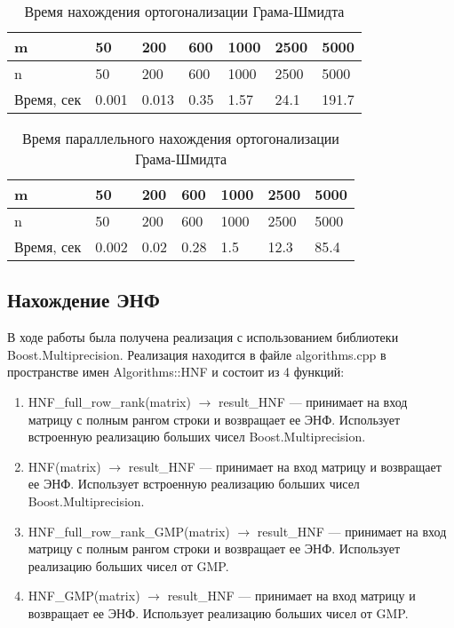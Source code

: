 \begin{table}[H]
  \caption{Время нахождения ортогонализации Грама-Шмидта}
  \centering
  \begin{tabular}{ | l | l | l | l | l | l | l | }
  \hline
  m & 50 & 200 & 600 & 1000 & 2500 & 5000 \\ \hline
  n & 50 & 200 & 600 & 1000 & 2500 & 5000  \\ \hline
  Время, сек & 0.001 & 0.013 & 0.35 & 1.57 & 24.1 & 191.7 \\ \hline
  \end{tabular}
  \label{table:GS_SEQ}
\end{table}

\begin{table}[H]
  \caption{Время параллельного нахождения ортогонализации Грама-Шмидта}
  \centering
  \begin{tabular}{ | l | l | l | l | l | l | l | }
  \hline
  m & 50 & 200 & 600 & 1000 & 2500 & 5000 \\ \hline
  n & 50 & 200 & 600 & 1000 & 2500 & 5000  \\ \hline
  Время, сек & 0.002 & 0.02 & 0.28 & 1.5 & 12.3 & 85.4 \\ \hline
  \end{tabular}
  \label{table:GS_PAR}
\end{table}

\subsection{Нахождение ЭНФ}

В ходе работы была получена реализация с использованием библиотеки Boost.Multiprecision. Реализация находится в файле algorithms.cpp в пространстве имен Algorithms::HNF и состоит из 4 функций:

\begin{enumerate}

\item HNF\_full\_row\_rank(matrix) $\rightarrow$ result\_HNF --- принимает на вход матрицу с полным рангом строки и возвращает ее ЭНФ. Использует встроенную реализацию больших чисел Boost.Multiprecision.

\item HNF(matrix) $\rightarrow$ result\_HNF --- принимает на вход матрицу и возвращает ее ЭНФ. Использует встроенную реализацию больших чисел Boost.Multiprecision.

\item HNF\_full\_row\_rank\_GMP(matrix) $\rightarrow$ result\_HNF --- принимает на вход матрицу с полным рангом строки и возвращает ее ЭНФ. Использует реализацию больших чисел от GMP.

\item HNF\_GMP(matrix) $\rightarrow$ result\_HNF --- принимает на вход матрицу и возвращает ее ЭНФ. Использует реализацию больших чисел от GMP.

\end{enumerate}

